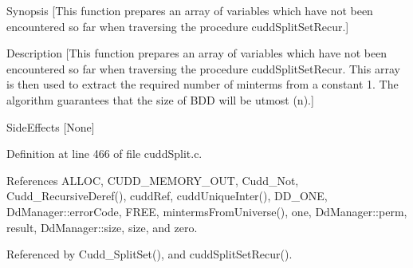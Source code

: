 Synopsis [This function prepares an array of variables which have not been encountered so far when traversing the procedure cudd\-Split\-Set\-Recur.]

Description [This function prepares an array of variables which have not been encountered so far when traversing the procedure cudd\-Split\-Set\-Recur. This array is then used to extract the required number of minterms from a constant 1. The algorithm guarantees that the size of BDD will be utmost (n).]

Side\-Effects [None] 

Definition at line 466 of file cudd\-Split.c.

References ALLOC, CUDD\_\-MEMORY\_\-OUT, Cudd\_\-Not, Cudd\_\-Recursive\-Deref(), cudd\-Ref, cudd\-Unique\-Inter(), DD\_\-ONE, Dd\-Manager::error\-Code, FREE, minterms\-From\-Universe(), one, Dd\-Manager::perm, result, Dd\-Manager::size, size, and zero.

Referenced by Cudd\_\-Split\-Set(), and cudd\-Split\-Set\-Recur().